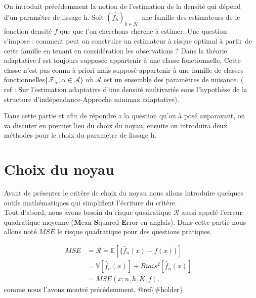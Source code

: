 \documentclass[
]{book}
\theoremstyle{definition}
\theoremstyle{definition}
\theoremstyle{definition}
\theoremstyle{definition}
\theoremstyle{remark}
\begin{document}
\hspace*{0.5cm} On introduit précédemment la notion de l'estimation de la densité qui dépend d'un paramètre de lissage h. Soit \((\hat{f_h})_{h\in \mathcal H}\) une famille des estimateurs de le fonction densité \(f\) que que l'on cherchons cherche à estimer.\newline
Une question s'impose : comment peut on construire un estimateur à risque optimal à partir de cette famille en tenant en considération les observations ? \newline
Dans la théorie adaptative f est toujours supposée appartenir à une classe fonctionnelle. Cette classe n'est pas connu à priori mais supposé appartenir à une famille de classes fonctionnelles\{\(\mathcal{F_{\alpha}},\alpha \in\mathcal{A}\)\} où \(\mathcal{A}\) est un ensemble des paramètres de nuisance. ( ref : Sur l'estimation adaptative d'une densité multivariée sous l'hypothèse de la structure d'indépendance-Approche minimax adaptative).\newline

\hspace*{0.5cm} Dans cette partie et afin de répondre a la question qu'on à posé auparavant, on va discuter en premier lieu du choix du noyau, ensuite on introduira deux méthodes pour le choix du paramètre de lissage h.

\hypertarget{choix-du-noyau}{%
\section{Choix du noyau}\label{choix-du-noyau}}

\hspace*{0.5cm} Avant de présenter le critère de choix du noyau nous allons introduire quelques outils mathématiques qui simplifient l'écriture du critère.\\
Tout d'abord, nous avons besoin du risque quadratique \(\mathcal R\) aussi appelé l'erreur quadratique moyenne (\textbf{M}ean \textbf{S}quared \textbf{E}rror en anglais). Dans cette partie nous allons noté \(MSE\) le risque quadratique pour des questions pratiques.

\[
\begin{aligned}
MSE &= \mathcal R = \mathbb E \left[ \{  \hat f_n(x)-f(x) \} \right] \\
&=\mathbb V \left[ \hat f_n(x) \right] + Biais^2 \left[ \hat f_n(x) \right] \\
&= MSE(x ; n, h, K, f).
\end{aligned}
\]
comme nous l'avons montré précédemment. @ref\{\#holder\}
\end{document}
